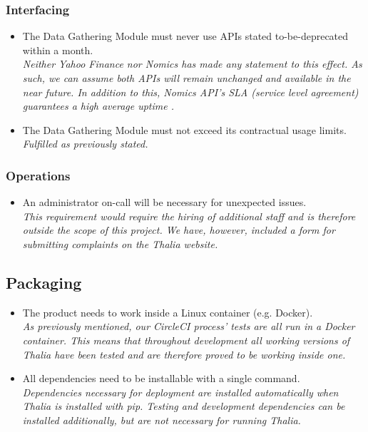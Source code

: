\documentclass[main.tex]{subfiles}
\begin{document}
\subsubsection{Interfacing}
\begin{itemize}

    \item The Data Gathering Module must never use APIs stated to-be-deprecated within a month.\\
    \textit{Neither Yahoo Finance nor Nomics has made any statement to this effect. As such, we can assume both APIs will remain unchanged and available in the near future. In addition to this, Nomics API’s SLA (service level agreement) guarantees a high average uptime \cite{nomicsAPISpec}.}
    \item The Data Gathering Module must not exceed its contractual usage limits.\\
    \textit{Fulfilled as previously stated.}

\end{itemize}

\subsubsection{Operations}
\begin{itemize}
    \item An administrator on-call will be necessary for unexpected issues.\\
    \textit{This requirement would require the hiring of additional staff and is therefore outside the scope of this project. We have, however, included a form for submitting complaints on the Thalia website.}
\end{itemize}

\subsection{Packaging}
    \begin{itemize}
    \item The product needs to work inside a Linux container (e.g. Docker).\\
    \textit{As previously mentioned, our CircleCI process’ tests are all run in a Docker container. This means that throughout development all working versions of Thalia have been tested and are therefore proved to be working inside one.}
    \item All dependencies need to be installable with a single command.\\
    \textit{Dependencies necessary for deployment are installed automatically when Thalia is installed with pip. Testing and development dependencies can be installed additionally, but are not necessary for running Thalia.}
\end{itemize}
\end{document}
